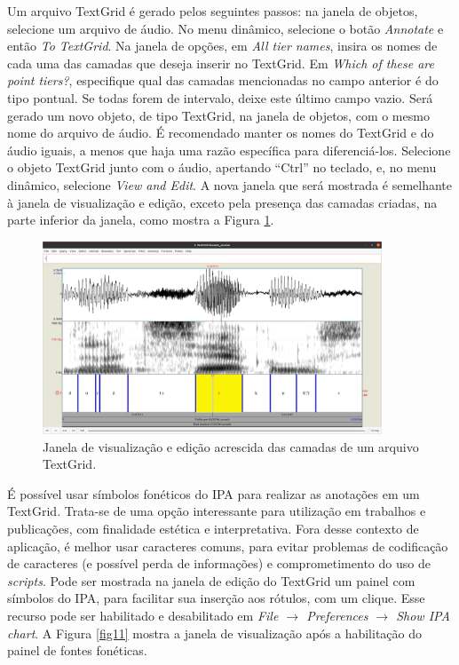 \documentclass[portuguese]{textolivre}
\begin{document}
Um arquivo TextGrid é gerado pelos seguintes passos: na janela de objetos, selecione um arquivo de áudio. No menu dinâmico, selecione o botão \textit{Annotate} e então \textit{To TextGrid}. Na janela de opções, em \textit{All tier names}, insira os nomes de cada uma das camadas que deseja inserir no TextGrid. Em \textit{Which of these are point tiers?}, especifique qual das camadas mencionadas no campo anterior é do tipo pontual. Se todas forem de intervalo, deixe este último campo vazio. Será gerado um novo objeto, de tipo TextGrid, na janela de objetos, com o mesmo nome do arquivo de áudio. É recomendado manter os nomes do TextGrid e do áudio iguais, a menos que haja uma razão específica para diferenciá-los. Selecione o objeto TextGrid junto com o áudio, apertando ``Ctrl'' no teclado, e, no menu dinâmico, selecione \textit{View and Edit}. A nova janela que será mostrada é semelhante à janela de visualização e edição, exceto pela presença das camadas criadas, na parte inferior da janela, como mostra a Figura \ref{fig10}.

\begin{figure}[H]
 \centering
 \includegraphics[width=0.9\textwidth]{Fig10.png}
 \caption{Janela de visualização e edição acrescida das camadas de um arquivo TextGrid.}
 \label{fig10}
\end{figure}

É possível usar símbolos fonéticos do IPA para realizar as anotações em um TextGrid. Trata-se de uma opção interessante para utilização em trabalhos e publicações, com finalidade estética e interpretativa. Fora desse contexto de aplicação, é melhor usar caracteres comuns, para evitar problemas de codificação de caracteres (e possível perda de informações) e comprometimento do uso de \textit{scripts}. Pode ser mostrada na janela de edição do TextGrid um painel com símbolos do IPA, para facilitar sua inserção aos rótulos, com um clique. Esse recurso pode ser habilitado e desabilitado em \textit{File $\rightarrow$ Preferences $\rightarrow$ Show IPA chart}. A Figura \ref{fig11} mostra a janela de visualização após a habilitação do painel de fontes fonéticas.
\end{document}
